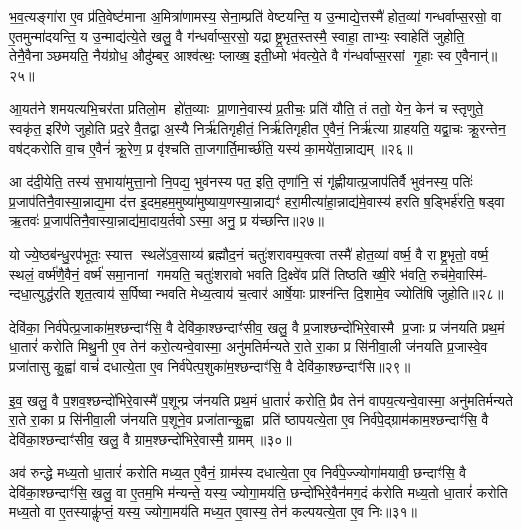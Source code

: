 भ॒व॒त्यङ्गा॑रा ए॒व प्र॑ति॒वेष्ट॑माना अ॒मित्रा॑णामस्य॒ सेना॒म्प्रति॑ वेष्टयन्ति॒ य उ॒न्माद्ये॒त्तस्मै॑ होत॒व्या॑ गन्धर्वाप्स॒रसो॒ वा ए॒तमुन्मा॑दयन्ति॒ य उ॒न्माद्य॑त्ये॒ते खलु॒ वै ग॑न्धर्वाप्स॒रसो॒ यद्राष्ट्र॒भृत॒स्तस्मै॒ स्वाहा॒ ताभ्यः॒ स्वाहेति॑ जुहोति॒ तेनै॒वैनाञ्छमयति॒ नैय॑ग्रोध॒ औदु॑म्बर॒ आश्व॑त्थः॒ प्लाख्ष॒ इती॒ध्मो भ॑वत्ये॒ते वै ग॑न्धर्वाप्स॒रसां गृ॒हाः स्व ए॒वैनान्॑॥२५॥

आ॒यत॑ने शमयत्यभि॒चर॑ता प्रतिलो॒म हो॑त॒व्याः प्रा॒णाने॒वास्य॑ प्र॒तीचः॒ प्रति॑ यौति॒ तं ततो॒ येन॒ केन॑ च स्तृणुते॒ स्वकृ॑त॒ इरि॑णे जुहोति प्रद॒रे वै॒तद्वा अ॒स्यै निर्\mbox{}ऋ॑तिगृहीतं॒ निर्\mbox{}ऋ॑तिगृहीत ए॒वैनं॒ निर्\mbox{}ऋ॑त्या ग्राहयति॒ यद्वा॒चः क्रू॒रन्तेन॒ वष॑ट्करोति वा॒च ए॒वैनं॑ क्रू॒रेण॒ प्र वृ॑श्चति ता॒जगार्ति॒मार्च्छ॑ति॒ यस्य॑ का॒मये॑ता॒न्नाद्यम्॥२६॥

आ द॑दी॒येति॒ तस्य॑ स॒भाया॑मुत्ता॒नो नि॒पद्य॒ भुव॑नस्य पत॒ इति॒ तृणा॑नि॒ सं गृ॑ह्णीयात्प्र॒जाप॑तिर्वै भुव॑नस्य॒ पतिः॑ प्र॒जाप॑तिनै॒वास्या॒न्नाद्य॒मा द॑त्त इ॒दम॒हम॒मुष्या॑मुष्याय॒णस्या॒न्नाद्यꣳ॑ हरा॒मीत्या॑हा॒न्नाद्य॑मे॒वास्य॑ हरति ष॒ड्भिर्\mbox{}ह॑रति॒ षड्वा ऋ॒तवः॑ प्र॒जाप॑तिनै॒वास्या॒न्नाद्य॑मा॒दाय॒र्तवोऽस्मा॒ अनु॒ प्र य॑च्छन्ति॥२७॥

यो ज्ये॒ष्ठब॑न्धु॒रप॑भूतः॒ स्यात्त स्थले॑ऽव॒साय्य॑ ब्रह्मौद॒नं चतुः॑शरावम्प॒क्त्वा तस्मै॑ होत॒व्या॑ वर्ष्म॒ वै राष्ट्र॒भृतो॒ वर्ष्म॒ स्थलं॒ वर्ष्म॑णै॒वैनं॒ वर्ष्म॑ समा॒नानां गमयति॒ चतुः॑शरावो भवति दि॒क्ष्वे॑व प्रति॑ तिष्ठति ख्षी॒रे भ॑वति॒ रुच॑मे॒वास्मि॑- न्दधा॒त्युद्ध॑रति शृत॒त्वाय॑ स॒र्पिष्वान्भवति मेध्य॒त्वाय॑ च॒त्वार॑ आर्\mbox{}षे॒याः प्राश्न॑न्ति दि॒शामे॒व ज्योति॑षि जुहोति॥२८॥

{\anuvakamend[{ग्रा॒मी यु॑नक्ती॒ध्मः स्व ए॒वैना॑न॒न्नाद्यं॑ यच्छ॒न्त्येका॒न्नप॑ञ्चा॒शच्च॑॥८॥}]}

देवि॑का॒ निर्व॑पेत्प्र॒जाका॑म॒श्छन्दाꣳ॑सि॒ वै देवि॑का॒श्छन्दाꣳ॑सीव॒ खलु॒ वै प्र॒जाश्छन्दो॑भिरे॒वास्मै प्र॒जाः प्र ज॑नयति प्रथ॒मं धा॒तारं॑ करोति मिथु॒नी ए॒व तेन॑ करो॒त्यन्वे॒वास्मा॒ अनु॑मतिर्मन्यते रा॒ते रा॒का प्र सि॑नीवा॒ली ज॑नयति प्र॒जास्वे॒व प्रजा॑तासु कु॒ह्वा॑ वाचं॑ दधात्ये॒ता ए॒व निर्व॑पेत्प॒शुका॑म॒श्छन्दाꣳ॑सि॒ वै देवि॑का॒श्छन्दाꣳ॑सि॥२९॥

इ॒व॒ खलु॒ वै प॒शव॒श्छन्दो॑भिरे॒वास्मै॑ प॒शून्प्र ज॑नयति प्रथ॒मं धा॒तारं॑ करोति॒ प्रैव तेन॑ वापय॒त्यन्वे॒वास्मा॒ अनु॑मतिर्मन्यते रा॒ते रा॒का प्र सि॑नीवा॒ली ज॑नयति प॒शूने॒व प्रजा॑तान्कु॒ह्वा प्रति॑ ष्ठापयत्ये॒ता ए॒व निर्व॑पे॒द्ग्राम॑काम॒श्छन्दाꣳ॑सि॒ वै देवि॑का॒श्छन्दाꣳ॑सीव॒ खलु॒ वै ग्राम॒श्छन्दो॑भिरे॒वास्मै॒ ग्रामम्॥३०॥

अव॑ रुन्द्धे मध्य॒तो धा॒तारं॑ करोति मध्य॒त ए॒वैनं॒ ग्राम॑स्य दधात्ये॒ता ए॒व निर्व॑पे॒ज्ज्योगा॑मयावी॒ छन्दाꣳ॑सि॒ वै देवि॑का॒श्छन्दाꣳ॑सि॒ खलु॒ वा ए॒तम॒भि म॑न्यन्ते॒ यस्य॒ ज्योगा॒मय॑ति॒ छन्दो॑भिरे॒वैन॑मग॒दं क॑रोति मध्य॒तो धा॒तारं॑ करोति मध्य॒तो वा ए॒तस्याकॢ॑प्तं॒ यस्य॒ ज्योगा॒मय॑ति मध्य॒त ए॒वास्य॒ तेन॑ कल्पयत्ये॒ता ए॒व निः॥३१॥

